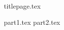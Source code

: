 %






	{titlepage.tex}
	\tableofcontents
	\newpage
	\listoffigures
	\newpage
	\listoflistings
	\newpage

	\newpage
	{part1.tex}
	\newpage
	{part2.tex}
%	
%	

